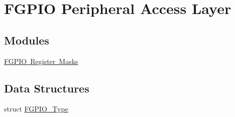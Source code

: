 \hypertarget{group___f_g_p_i_o___peripheral___access___layer}{}\section{F\+G\+P\+IO Peripheral Access Layer}
\label{group___f_g_p_i_o___peripheral___access___layer}
\subsection*{Modules}
\begin{DoxyCompactItemize}
\item 
\mbox{\hyperlink{group___f_g_p_i_o___register___masks}{F\+G\+P\+I\+O Register Masks}}
\end{DoxyCompactItemize}
\subsection*{Data Structures}
\begin{DoxyCompactItemize}
\item 
struct \mbox{\hyperlink{struct_f_g_p_i_o___type}{F\+G\+P\+I\+O\+\_\+\+Type}}
\end{DoxyCompactItemize}
